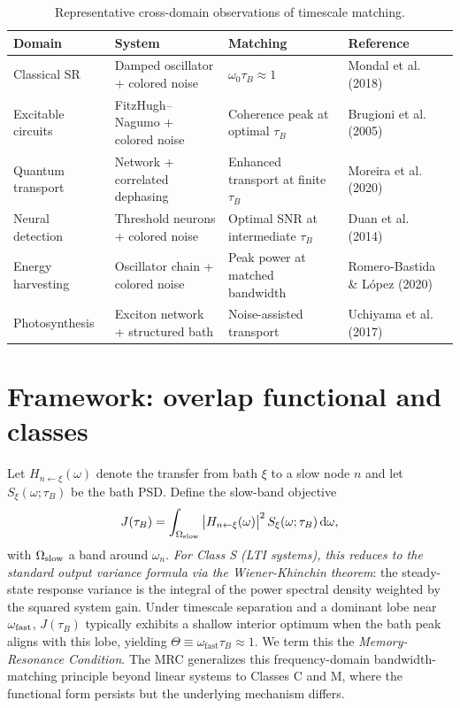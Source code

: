 \documentclass[11pt,letterpaper]{article}
\begin{document}
\begin{table}[t]
\centering
\caption{Representative cross-domain observations of timescale matching.}
\label{tab:crossdomain}
\begin{tabularx}{\linewidth}{@{}lYYl@{}}
\toprule
Domain & System & Matching & Reference \\
\midrule
Classical SR & Damped oscillator + colored noise & $\omega_0 \tau_B \approx 1$ & Mondal et al. (2018) \cite{Mondal2018} \\
Excitable circuits & FitzHugh--Nagumo + colored noise & Coherence peak at optimal $\tau_B$ & Brugioni et al. (2005) \cite{Brugioni2005} \\
Quantum transport & Network + correlated dephasing & Enhanced transport at finite $\tau_B$ & Moreira et al. (2020) \cite{Moreira2020} \\
Neural detection & Threshold neurons + colored noise & Optimal SNR at intermediate $\tau_B$ & Duan et al. (2014) \cite{Duan2014} \\
Energy harvesting & Oscillator chain + colored noise & Peak power at matched bandwidth & Romero-Bastida \& L\'opez (2020) \cite{RomeroBastida2020} \\
Photosynthesis & Exciton network + structured bath & Noise-assisted transport & Uchiyama et al. (2017) \cite{Uchiyama2017} \\
\bottomrule
\end{tabularx}
\end{table}

\clearpage
\section{Framework: overlap functional and classes}
Let $H_{n\leftarrow\xi}(\omega)$ denote the transfer from bath $\xi$ to a slow node $n$ and let $S_\xi(\omega;\tau_B)$ be the bath PSD. Define the slow-band objective
\begin{equation}
J(\tau_B) = \int_{\Omega_{\rm slow}} \big|H_{n\leftarrow\xi}(\omega)\big|^2\, S_\xi(\omega;\tau_B)\, \mathrm{d}\omega,
\end{equation}
with $\Omega_{\rm slow}$ a band around $\omega_n$. \emph{For Class S (LTI systems), this reduces to the standard output variance formula via the Wiener-Khinchin theorem}: the steady-state response variance is the integral of the power spectral density weighted by the squared system gain. Under timescale separation and a dominant lobe near $\omega_{\rm fast}$, $J(\tau_B)$ typically exhibits a shallow interior optimum when the bath peak aligns with this lobe, yielding $\Theta \equiv \omega_{\mathrm{fast}} \tau_B \approx 1$. We term this the \emph{Memory-Resonance Condition}. The MRC generalizes this frequency-domain bandwidth-matching principle beyond linear systems to Classes C and M, where the functional form persists but the underlying mechanism differs.
\end{document}

